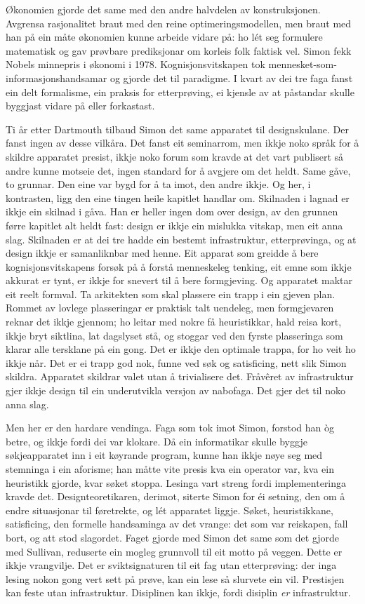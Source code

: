 Økonomien gjorde det same med den andre halvdelen av konstruksjonen. Avgrensa rasjonalitet braut med den reine optimeringsmodellen, men braut med han på ein måte økonomien kunne arbeide vidare på: ho lét seg formulere matematisk og gav prøvbare prediksjonar om korleis folk faktisk vel. Simon fekk Nobels minnepris i økonomi i 1978. Kognisjonsvitskapen tok mennesket-som-informasjonshandsamar og gjorde det til paradigme. I kvart av dei tre faga fanst ein delt formalisme, ein praksis for etterprøving, ei kjensle av at påstandar skulle byggjast vidare på eller forkastast.

Ti år etter Dartmouth tilbaud Simon det same apparatet til designskulane. Der fanst ingen av desse vilkåra. Det fanst eit seminarrom, men ikkje noko språk for å skildre apparatet presist, ikkje noko forum som kravde at det vart publisert så andre kunne motseie det, ingen standard for å avgjere om det heldt. Same gåve, to grunnar. Den eine var bygd for å ta imot, den andre ikkje. Og her, i kontrasten, ligg den eine tingen heile kapitlet handlar om. Skilnaden i lagnad er ikkje ein skilnad i gåva. Han er heller ingen dom over design, av den grunnen førre kapitlet alt heldt fast: design er ikkje ein mislukka vitskap, men eit anna slag. Skilnaden er at dei tre hadde ein bestemt infrastruktur, etterprøvinga, og at design ikkje er samanliknbar med henne. Eit apparat som greidde å bere kognisjonsvitskapens forsøk på å forstå menneskeleg tenking, eit emne som ikkje akkurat er tynt, er ikkje for snevert til å bere formgjeving. Og apparatet maktar eit reelt formval. Ta arkitekten som skal plassere ein trapp i ein gjeven plan. Rommet av lovlege plasseringar er praktisk talt uendeleg, men formgjevaren reknar det ikkje gjennom; ho leitar med nokre få heuristikkar, hald reisa kort, ikkje bryt siktlina, lat dagslyset stå, og stoggar ved den fyrste plasseringa som klarar alle tersklane på ein gong. Det er ikkje den optimale trappa, for ho veit ho ikkje når. Det er ei trapp god nok, funne ved søk og satisficing, nett slik Simon skildra. Apparatet skildrar valet utan å trivialisere det. Fråvêret av infrastruktur gjer ikkje design til ein underutvikla versjon av nabofaga. Det gjer det til noko anna slag.

Men her er den hardare vendinga. Faga som tok imot Simon, forstod han òg betre, og ikkje fordi dei var klokare. Då ein informatikar skulle byggje søkjeapparatet inn i eit køyrande program, kunne han ikkje nøye seg med stemninga i ein aforisme; han måtte vite presis kva ein operator var, kva ein heuristikk gjorde, kvar søket stoppa. Lesinga vart streng fordi implementeringa kravde det. Designteoretikaren, derimot, siterte Simon for éi setning, den om å endre situasjonar til føretrekte, og lét apparatet liggje. Søket, heuristikkane, satisficing, den formelle handsaminga av det vrange: det som var reiskapen, fall bort, og att stod slagordet. Faget gjorde med Simon det same som det gjorde med Sullivan, reduserte ein mogleg grunnvoll til eit motto på veggen. Dette er ikkje vrangvilje. Det er sviktsignaturen til eit fag utan etterprøving: der inga lesing nokon gong vert sett på prøve, kan ein lese så slurvete ein vil. Prestisjen kan feste utan infrastruktur. Disiplinen kan ikkje, fordi disiplin \emph{er} infrastruktur.

